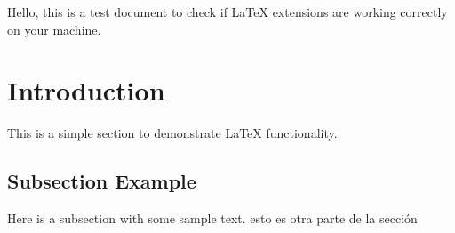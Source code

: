 \documentclass{article}
\begin{document}
Hello, this is a test document to check if LaTeX extensions are working correctly on your machine.

\section{Introduction}
This is a simple section to demonstrate LaTeX functionality.

\subsection{Subsection Example}
Here is a subsection with some sample text.
esto es otra parte de la sección
\end{document}
